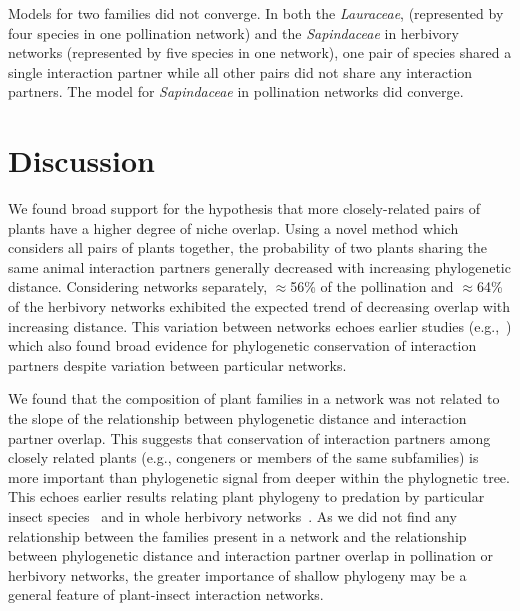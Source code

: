 \documentclass[12pt]{article}
\begin{document}
\begin{spacing}{1.5}
    Models for two families did not converge. In both the \emph{Lauraceae}, (represented by four species in one pollination network) and the \emph{Sapindaceae} in herbivory networks (represented by five species in one network), one pair of species shared a single interaction partner while all other pairs did not share any interaction partners. The model for \emph{Sapindaceae} in pollination networks did converge.


\section*{Discussion} 


  We found broad support for the hypothesis that more
  closely-related pairs of plants have a higher degree
  of niche overlap. Using a novel method which considers
  all pairs of plants together, 
  the probability of two plants sharing the same animal 
  interaction partners generally decreased with increasing 
  phylogenetic distance. Considering networks separately,
  $\approx$56\%  of the pollination and $\approx$64\% of the 
  herbivory networks exhibited the expected trend of decreasing 
  overlap with increasing distance. This variation between networks
  echoes earlier studies (e.g.,~\citep{Fontaine2015,Hutchinson2017})
  which also found broad evidence for phylogenetic conservation
  of interaction partners despite variation between particular 
  networks. 
 


  We found that the composition of plant families in a network
  was not related to the slope of the relationship between phylogenetic
  distance and interaction partner overlap. This suggests that 
  conservation of interaction partners among closely related plants
  (e.g., congeners or members of the same subfamilies) is more
  important than phylogenetic signal from deeper within the phylognetic
  tree. This echoes earlier results relating plant phylogeny to 
  predation by particular insect species~\citep{Novotny2002,Novotny2004,
  Odegaard2005} and in whole herbivory networks~\citep{Volf2017}. As
  we did not find any relationship between the families present in
  a network and the relationship between phylogenetic distance and
  interaction partner overlap in pollination or herbivory networks,
  the greater importance of shallow phylogeny may be a general 
  feature of plant-insect interaction networks.



\end{spacing}
\end{document}
